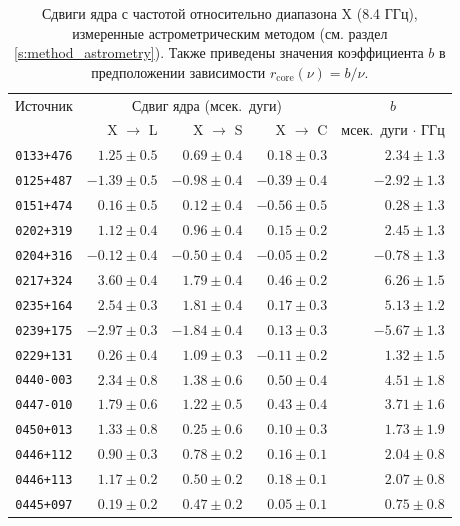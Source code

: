 \clearpage
\begin{table}
 \caption{Сдвиги ядра с частотой относительно диапазона X (8.4 ГГц), измеренные астрометрическим
методом (см. раздел \ref{s:method_astrometry}). Также приведены значения коэффициента $b$ в
предположении зависимости $r_\mathrm{core}(\nu) = b / \nu$.}
 \bigskip
 \label{tab:cs_jet}{%
 \begin{tabular}{|c|r|r|r|r|}
  \hline
  Источник & \multicolumn{3}{c|}{Сдвиг ядра (мсек.~дуги)} & \multicolumn{1}{c|}{$b$} \\
  \cline{2-4}
  & X $\rightarrow$ L & X $\rightarrow$ S & X $\rightarrow$ C & мсек.~дуги $\cdot$ ГГц \\
\hline

\texttt{0133+476} & $1.25\pm 0.5$ & $0.69\pm 0.4$ & $0.18\pm 0.3$ & $2.34 \pm 1.3$ \\
\texttt{0125+487} & $-1.39\pm 0.5$ & $-0.98\pm 0.4$ & $-0.39\pm 0.4$ & $-2.92 \pm 1.3$ \\
\texttt{0151+474} & $0.16\pm 0.5$ & $0.12\pm 0.4$ & $-0.56\pm 0.5$ & $0.28 \pm 1.3$ \\
\texttt{0202+319} & $1.12\pm 0.4$ & $0.96\pm 0.4$ & $0.15\pm 0.2$ & $2.45 \pm 1.3$ \\
\texttt{0204+316} & $-0.12\pm 0.4$ & $-0.50\pm 0.4$ & $-0.05\pm 0.2$ & $-0.78 \pm 1.3$ \\
\texttt{0217+324} & $3.60\pm 0.4$ & $1.79\pm 0.4$ & $0.46\pm 0.2$ & $6.26 \pm 1.5$ \\
\texttt{0235+164} & $2.54\pm 0.3$ & $1.81\pm 0.4$ & $0.17\pm 0.3$ & $5.13 \pm 1.2$ \\
\texttt{0239+175} & $-2.97\pm 0.3$ & $-1.84\pm 0.4$ & $0.13\pm 0.3$ & $-5.67 \pm 1.3$ \\
\texttt{0229+131} & $0.26\pm 0.4$ & $1.09\pm 0.3$ & $-0.11\pm 0.2$ & $1.32 \pm 1.5$ \\
\texttt{0440-003} & $2.34\pm 0.8$ & $1.38\pm 0.6$ & $0.50\pm 0.4$ & $4.51 \pm 1.8$ \\
\texttt{0447-010} & $1.79\pm 0.6$ & $1.22\pm 0.5$ & $0.43\pm 0.4$ & $3.71 \pm 1.6$ \\
\texttt{0450+013} & $1.33\pm 0.8$ & $0.25\pm 0.6$ & $0.10\pm 0.3$ & $1.73 \pm 1.9$ \\
\texttt{0446+112} & $0.90\pm 0.3$ & $0.78\pm 0.2$ & $0.16\pm 0.1$ & $2.04 \pm 0.8$ \\
\texttt{0446+113} & $1.17\pm 0.2$ & $0.50\pm 0.2$ & $0.18\pm 0.1$ & $2.07 \pm 0.8$ \\
\texttt{0445+097} & $0.19\pm 0.2$ & $0.47\pm 0.2$ & $0.05\pm 0.1$ & $0.75 \pm 0.8$ \\

\end{tabular}}
\end{table}

